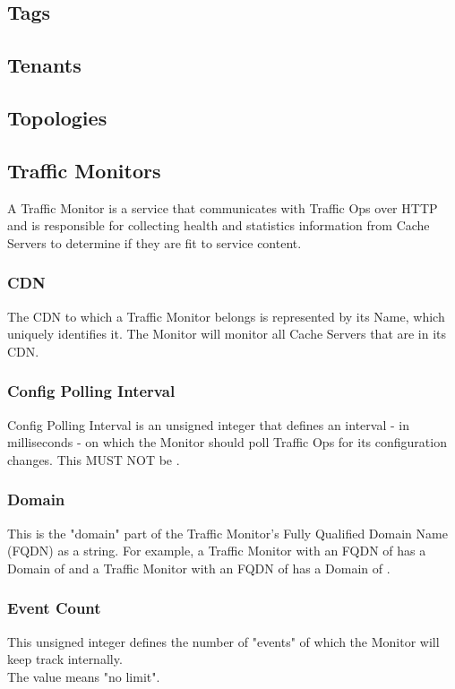 \subsection{Tags}



\subsection{Tenants}


\subsection{Topologies}


\subsection{Traffic Monitors}
A Traffic Monitor is a service that communicates with Traffic Ops over HTTP and
is responsible for collecting health and statistics information from Cache
Servers to determine if they are fit to service content.

\subsubsection{CDN}
The CDN to which a Traffic Monitor belongs is represented by its Name, which
uniquely identifies it. The Monitor will monitor all Cache Servers that are in
its CDN.

\subsubsection{Config Polling Interval}
Config Polling Interval is an unsigned integer that defines an interval - in
milliseconds - on which the Monitor should poll Traffic Ops for its
configuration changes. This MUST NOT be .

\subsubsection{Domain}
This is the "domain" part of the Traffic Monitor's Fully Qualified Domain Name
(FQDN) as a string. For example, a Traffic Monitor with an FQDN of
 has a Domain of  and a Traffic Monitor with an FQDN
of  has a Domain of .

\subsubsection{Event Count}
This unsigned integer defines the number of "events" of which the Monitor will
keep track internally.\\
The value  means "no limit".

